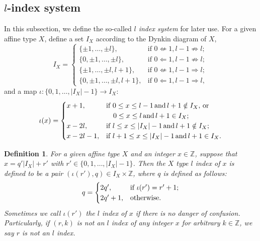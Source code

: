 \documentclass[11pt]{amsart}
\theoremstyle{plain}
\numberwithin{equation}{subsection}
\newtheorem{definition}[theorem]{Definition}
\begin{document}
\subsection{$l$-index system}
In this subsection, we define the so-called {\em $l$ index system} for later use. 
For a given affine type  $X$, define 
a set $I_X$ according to the Dynkin diagram of $X$, 
$$I_X=\begin{cases}
        \{\pm 1, \dots, \pm l\}, & \mbox{if }  0 \nLeftarrow 1, l-1 \nRightarrow l;\\
        \{0, \pm 1, \dots, \pm l\}, & \mbox{if } 0 \Leftarrow 1,  l-1 \nRightarrow l;\\
       \{\pm 1, \dots, \pm l, l+1\}, & \mbox{if }  0 \nLeftarrow 1,  l-1 \Rightarrow l;\\
        \{0, \pm 1, \dots, \pm l, l+1\}, & \mbox{if } 0 \Leftarrow 1,  l-1 \Rightarrow l,
      \end{cases}$$
and a map $\iota: \{0, 1, \dots, |I_X|-1\}\rightarrow I_X$:     
$$\iota(x)=\begin{cases}
             x+1, & \mbox{if } 0\leq x \leq  l-1\, {\rm and}\, l+1\notin I_X, \,{\rm or}\\
             &  \,\,\,\,\,\,0\leq x \leq  l\, {\rm and}\, l+1\in I_X;\\
             x-2l, & \mbox{if } l\leq x \leq |I_X|-1\, {\rm and}\, l+1\notin I_X;\\
             x-2l-1, & \mbox{if } l+1\leq x\leq  |I_X|-1 \,{\rm and}\, l+1\in I_X.
           \end{cases}$$     
     
\begin{definition}\label{2.13}
For a given affine type $X$ and an integer $x\in\mathbb{Z}$, suppose that $x=q'|I_X|+r'$ with $r'\in \{0, 1, \dots, |I_X|-1\}$. 
Then the $X$ type $l$ index of $x$ is defined to be a pair $(\iota(r'),q)\in I_X\times \mathbb{Z}$, where $q$ is defined as follows: 
$$q=\begin{cases}
      2q', & \mbox{\rm if } \iota(r')=r'+1; \\
      2q'+1, & \mbox{\rm otherwise}.
    \end{cases}$$
Sometimes we call $\iota(r')$ the $l$ index of $x$ if there is no danger of confusion. 
Particularly, if $(r, k)$ is not an $l$ index of any integer $x$ for arbitrary $k\in \mathbb{Z}$, we say $r$ is not an $l$ index.
\end{definition}
\end{document}
